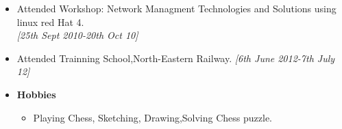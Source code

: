 \begin{itemize}
		\item Attended Workshop: Network Managment Technologies and Solutions using linux red Hat 4.\\ \emph{[25th Sept 2010-20th Oct 10]}\\ [-0.6cm] 
		\item Attended Trainning School,North-Eastern Railway. \hfill \emph{[6th June 2012-7th July 12]}\\[-0.6cm] 
		\item {\bf Hobbies}\\ [-0.6cm]
		\begin{itemize}
		 \item Playing Chess, Sketching, Drawing,Solving Chess puzzle.
		\end{itemize}
\end{itemize}
